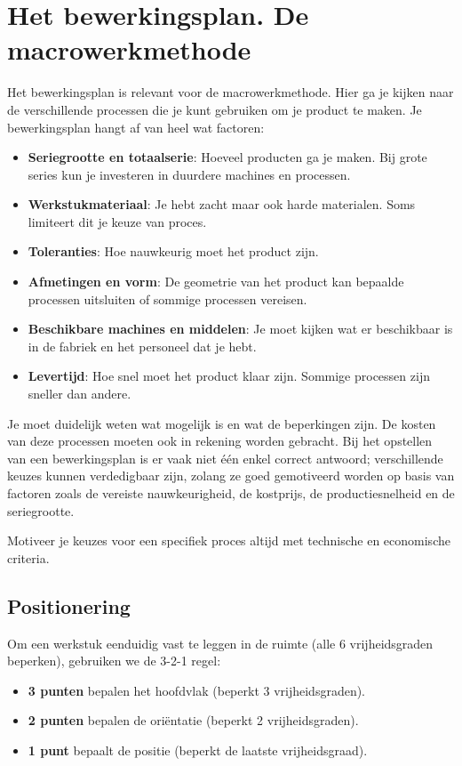 \documentclass[a4paper,11pt,twoside]{report}
\begin{document}
\section{Het bewerkingsplan. De macrowerkmethode}
Het bewerkingsplan is relevant voor de macrowerkmethode.
Hier ga je kijken naar de verschillende processen die je kunt gebruiken om je product te maken.
Je bewerkingsplan hangt af van heel wat factoren:
\begin{itemize}
    \item \textbf{Seriegrootte en totaalserie}: Hoeveel producten ga je maken. Bij grote series kun je investeren in
          duurdere machines en processen.
    \item \textbf{Werkstukmateriaal}: Je hebt zacht maar ook harde materialen. Soms limiteert dit je keuze van proces.
    \item \textbf{Toleranties}: Hoe nauwkeurig moet het product zijn.
    \item \textbf{Afmetingen en vorm}: De geometrie van het product kan bepaalde processen uitsluiten of sommige processen vereisen.
    \item \textbf{Beschikbare machines en middelen}: Je moet kijken wat er beschikbaar is in de fabriek en het personeel dat je hebt.
    \item \textbf{Levertijd}: Hoe snel moet het product klaar zijn. Sommige processen zijn sneller dan andere.
\end{itemize}

Je moet duidelijk weten wat mogelijk is en wat de beperkingen zijn.
De kosten van deze processen moeten ook in rekening worden gebracht.
Bij het opstellen van een bewerkingsplan is er vaak niet één enkel correct antwoord; verschillende keuzes kunnen verdedigbaar zijn,
zolang ze goed gemotiveerd worden op basis van factoren zoals de vereiste nauwkeurigheid, de kostprijs,
de productiesnelheid en de seriegrootte.

\begin{examenbox}
    Motiveer je keuzes voor een specifiek proces altijd met technische en economische criteria.
\end{examenbox}

\subsection{Positionering}

\begin{conceptbox}[3-2-1 Methode]
    Om een werkstuk eenduidig vast te leggen in de ruimte (alle 6 vrijheidsgraden beperken), gebruiken we de 3-2-1 regel:
    \begin{itemize}
        \item \textbf{3 punten} bepalen het hoofdvlak (beperkt 3 vrijheidsgraden).
        \item \textbf{2 punten} bepalen de oriëntatie (beperkt 2 vrijheidsgraden).
        \item \textbf{1 punt} bepaalt de positie (beperkt de laatste vrijheidsgraad).
    \end{itemize}
\end{conceptbox}
\end{document}
